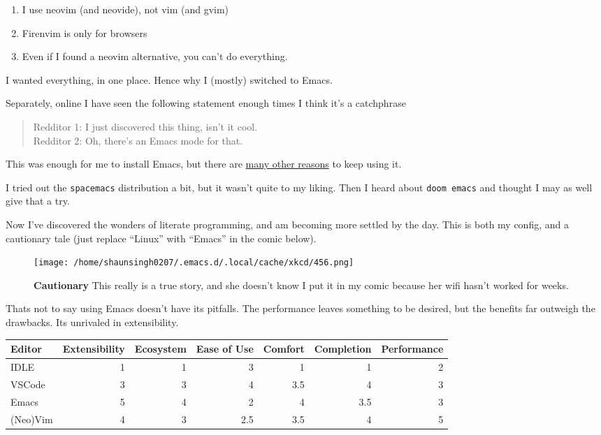 \documentclass{scrartcl}
\begin{document}
\begin{enumerate}
\item I use neovim (and neovide), not vim (and gvim)
\item Firenvim is only for browsers
\item Even if I found a neovim alternative, you can't do everything.
\end{enumerate}

I wanted everything, in one place. Hence why I (mostly) switched to Emacs.

Separately, online I have seen the following statement enough times I think it's a catchphrase
\begin{quote}
Redditor 1: I just discovered this thing, isn't it cool. \\
Redditor 2: Oh, there's an Emacs mode for that.
\end{quote}

This was enough for me to install Emacs, but there are
\href{https://github.com/remacs/remacs\#why-emacs}{many other reasons} to keep using it.

I tried out the \texttt{spacemacs} distribution a bit, but it wasn't quite to my liking.
Then I heard about \texttt{doom emacs} and thought I may as well give that a try.

Now I've discovered the wonders of literate programming, and am becoming more
settled by the day. This is both my config, and a cautionary tale (just replace
``Linux'' with ``Emacs'' in the comic below).

\begin{figure}[!htb]
	  \centering
	  \texttt{[image: /home/shaunsingh0207/.emacs.d/.local/cache/xkcd/456.png]}
  \caption*{\label{xkcd:456} \textbf{Cautionary} This really is a true story, and she doesn't know I put it in my comic because her wifi hasn't worked for weeks.}
	\end{figure}

Thats not to say using Emacs doesn't have its pitfalls. The performance leaves
something to be desired, but the benefits far outweigh the drawbacks. Its
unrivaled in extensibility.

\begin{center}
\begin{tabular}{lrrrrrr}
\toprule
Editor & Extensibility & Ecosystem & Ease of Use & Comfort & Completion & Performance\\
\midrule
IDLE & 1 & 1 & 3 & 1 & 1 & 2\\
VSCode & 3 & 3 & 4 & 3.5 & 4 & 3\\
Emacs & 5 & 4 & 2 & 4 & 3.5 & 3\\
(Neo)Vim & 4 & 3 & 2.5 & 3.5 & 4 & 5\\
\bottomrule
\end{tabular}
\end{center}
\end{document}

